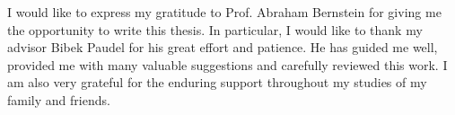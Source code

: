 \begin{acknowledgements}
I would like to express my gratitude to Prof. Abraham Bernstein for giving me the opportunity to write this thesis.
In particular, I would like to thank my advisor Bibek Paudel for his great effort and patience.
He has guided me well, provided me with many valuable suggestions and carefully reviewed this work.
I am also very grateful for the enduring support throughout my studies of my family and friends.
\end{acknowledgements}
